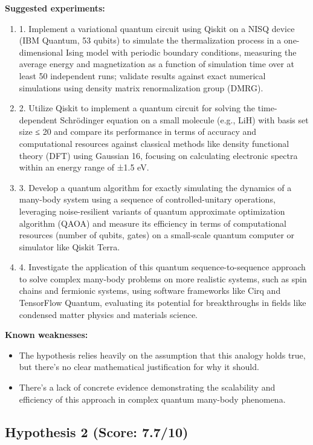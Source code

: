 \documentclass[12pt,a4paper]{article}
\begin{document}
\textbf{Suggested experiments:}
\begin{enumerate}
  \item 1. Implement a variational quantum circuit using Qiskit on a NISQ device (IBM Quantum, 53 qubits) to simulate the thermalization process in a one-dimensional Ising model with periodic boundary conditions, measuring the average energy and magnetization as a function of simulation time over at least 50 independent runs; validate results against exact numerical simulations using density matrix renormalization group (DMRG).
  \item 2. Utilize Qiskit to implement a quantum circuit for solving the time-dependent Schrödinger equation on a small molecule (e.g., LiH) with basis set size ≤ 20 and compare its performance in terms of accuracy and computational resources against classical methods like density functional theory (DFT) using Gaussian 16, focusing on calculating electronic spectra within an energy range of ±1.5 eV.
  \item 3. Develop a quantum algorithm for exactly simulating the dynamics of a many-body system using a sequence of controlled-unitary operations, leveraging noise-resilient variants of quantum approximate optimization algorithm (QAOA) and measure its efficiency in terms of computational resources (number of qubits, gates) on a small-scale quantum computer or simulator like Qiskit Terra. 
  \item 4. Investigate the application of this quantum sequence-to-sequence approach to solve complex many-body problems on more realistic systems, such as spin chains and fermionic systems, using software frameworks like Cirq and TensorFlow Quantum, evaluating its potential for breakthroughs in fields like condensed matter physics and materials science.
\end{enumerate}

\textbf{Known weaknesses:}
\begin{itemize}
  \item The hypothesis relies heavily on the assumption that this analogy holds true, but there's no clear mathematical justification for why it should.
  \item There's a lack of concrete evidence demonstrating the scalability and efficiency of this approach in complex quantum many-body phenomena.
\end{itemize}
\subsection*{Hypothesis 2 (Score: 7.7/10)}
\end{document}

